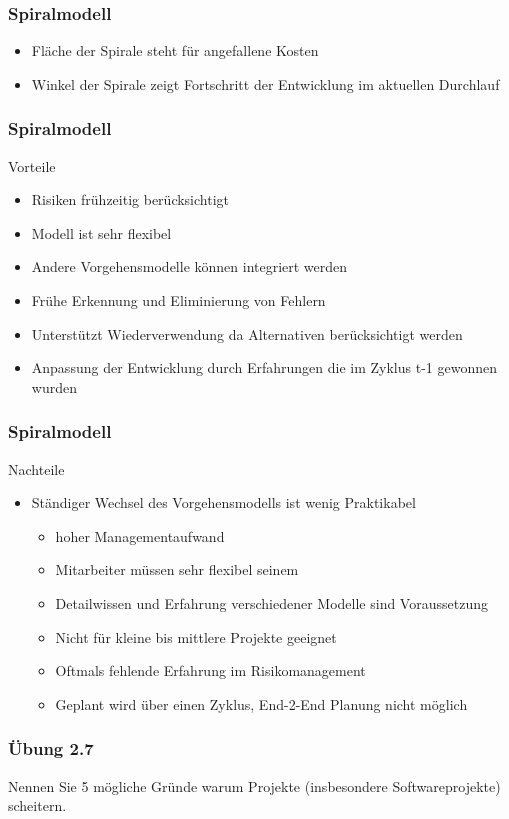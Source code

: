 \begin{frame}
\frametitle{Spiralmodell}
	\begin{itemize}
		\item Fläche der Spirale steht für angefallene Kosten
		\item Winkel der Spirale zeigt Fortschritt der Entwicklung im aktuellen Durchlauf 
	\end{itemize}
\end{frame}

\begin{frame}
\frametitle{Spiralmodell}
	Vorteile
	\begin{itemize}
		\item Risiken frühzeitig berücksichtigt
		\item Modell ist sehr flexibel
		\item Andere Vorgehensmodelle können integriert werden
		\item Frühe Erkennung und Eliminierung von Fehlern
		\item Unterstützt Wiederverwendung da Alternativen berücksichtigt werden
		\item Anpassung der Entwicklung durch Erfahrungen die im Zyklus t-1 gewonnen wurden
	\end{itemize}
\end{frame}

\begin{frame}
\frametitle{Spiralmodell}
	Nachteile
	\begin{itemize}
	\item Ständiger Wechsel des Vorgehensmodells ist wenig Praktikabel
			\begin{itemize}
				\item hoher Managementaufwand
				\item Mitarbeiter müssen sehr flexibel seinem
				\item Detailwissen und Erfahrung verschiedener Modelle sind Voraussetzung
				\item Nicht für kleine bis mittlere Projekte geeignet
				\item Oftmals fehlende Erfahrung im Risikomanagement
				\item Geplant wird über einen Zyklus, End-2-End Planung nicht möglich
			\end{itemize}
	\end{itemize}
\end{frame}

\begin{frame}
\frametitle{Übung 2.7}
	Nennen Sie 5 mögliche Gründe warum Projekte (insbesondere Softwareprojekte) scheitern.
\end{frame}

